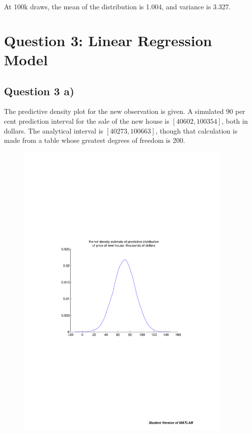 \documentclass[a4paper,11pt]{article}
\begin{document}
At 100k draws, the mean of the distribution is 1.004, and variance is 3.327.


\section*{Question 3: Linear Regression Model}

\subsection*{Question 3 a)}

The predictive density plot for the new observation is given. A simulated 90 per cent prediction interval for the sale of the new house is $[40602, 100354]$, both in dollars. The analytical interval is $[40273, 100663]$, though that calculation is made from a table whose greatest degrees of freedom is 200.

\begin{figure}
  \centering
  \includegraphics[width=300pt]{predictive_density.pdf}\\
  \label{preddensity}
\end{figure}
\end{document}
